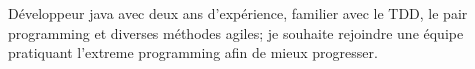 
\begin{cvparagraph}

Développeur java avec deux ans d'expérience, familier avec le TDD, le pair programming et diverses méthodes agiles; je souhaite rejoindre une équipe pratiquant l'extreme programming afin de mieux progresser.

\end{cvparagraph}

